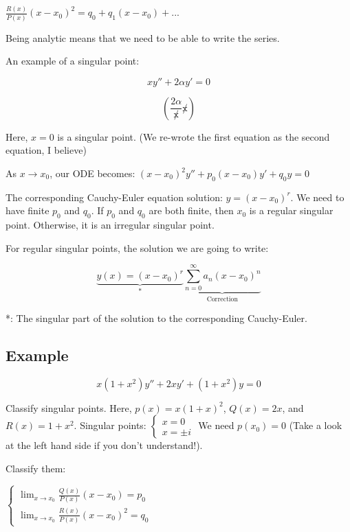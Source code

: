 \documentclass{article}
\begin{document}
$\frac{R(x)}{P(x)} (x - x_0)^2 = q_0 + q_1 (x - x_0) + ...$

Being analytic means that we need to be able to write the series. 

An example of a singular point:


$$xy'' + 2 \alpha y' = 0$$

$$\left(\frac{2 \alpha}{\not x} \not x \right)$$



Here, $x = 0$ is a singular point. (We re-wrote the first equation as the second equation, I believe)

\hfill \break

As $x \longrightarrow x_0$, our ODE becomes: $(x - x_0)^2 y'' + p_0 (x - x_0) y' + q_0 y = 0$

The corresponding Cauchy-Euler equation solution: $y = (x - x_0)^r$. We need to have finite $p_0$ and $q_0$. If $p_0$ and $q_0$ are both finite, then $x_0$ is a regular singular point. Otherwise, it is an irregular singular point. 

For regular singular points, the solution we are going to write: 

$$\underbrace{y(x) = (x - x_0)^r}_{*} \underbrace{\sum_{n = 0}^{\infty} a_n (x - x_0)^n}_{\text{Correction}}$$

*: The singular part of the solution to the corresponding Cauchy-Euler. 

\subsection{Example}

$$x(1+x^2) y'' + 2xy' + (1+x^2) y = 0$$

Classify singular points. Here, $p(x) = x(1+x)^2$, $Q(x) = 2x$, and $R(x) = 1+x^2$. Singular points: $\left\{ \begin{matrix} x = 0 \\ x = \pm i \end{matrix} \right.$ We need $p(x_0) = 0$ (Take a look at the left hand side if you don't understand!). 

Classify them:

$\left\{ \begin{matrix} \lim_{x \rightarrow x_0} \frac{Q(x)}{P(x)} (x - x_0) = p_0 \\ \lim_{x \rightarrow x_0} \frac{R(x)}{P(x)} (x - x_0)^2 = q_0 \end{matrix} \right.$
\end{document}
